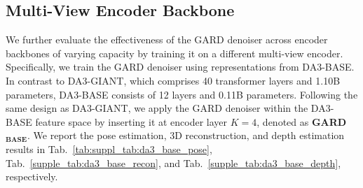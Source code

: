 \subsection{Multi-View Encoder Backbone}
We further evaluate the effectiveness of the GARD denoiser across encoder backbones of varying capacity by training it on a different multi-view encoder. Specifically, we train the GARD denoiser using representations from DA3-BASE. In contrast to DA3-GIANT, which comprises 40 transformer layers and 1.10B parameters, DA3-BASE consists of 12 layers and 0.11B parameters. Following the same design as DA3-GIANT, we apply the GARD denoiser within the DA3-BASE feature space by inserting it at encoder layer $K=4$, denoted as \textbf{GARD}$_{\textbf{BASE}}$. We report the pose estimation, 3D reconstruction, and depth estimation results in Tab.~\ref{tab:suppl_tab:da3_base_pose}, Tab.~\ref{supple_tab:da3_base_recon}, and Tab.~\ref{supple_tab:da3_base_depth}, respectively.



